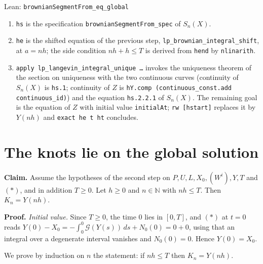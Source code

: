 \documentclass[11pt,a4paper]{article}
\begin{document}
\begin{leanbox}{Lean: \texttt{brownianSegmentFrom\_\allowbreak{}eq\_\allowbreak{}global}}
\begin{enumerate}


\item \texttt{hs} is the specification \texttt{brownian\allowbreak{}Segment\allowbreak{}From\_\allowbreak{}spec} of \(S_n(X)\).

\item \texttt{he} is the shifted equation of the previous step, \texttt{lp\_\allowbreak{}brownian\_\allowbreak{}integral\_\allowbreak{}shift}, at \(a=nh\); the side condition \(nh+h\le T\) is derived from \texttt{hend} by \texttt{nlinarith}.

\item \texttt{apply lp\_\allowbreak{}langevin\_\allowbreak{}integral\_\allowbreak{}unique …} invokes the uniqueness theorem of the section on uniqueness with the two continuous curves (continuity of \(S_n(X)\) is \texttt{hs.\allowbreak{}1}; continuity of \(Z\) is \texttt{h\allowbreak{}Y.\allowbreak{}comp (continuous\_\allowbreak{}const.\allowbreak{}add continuous\_\allowbreak{}id)}) and the equation \texttt{hs.\allowbreak{}2.\allowbreak{}2.\allowbreak{}1} of \(S_n(X)\). The remaining goal is the equation of \(Z\) with initial value \texttt{initial\allowbreak{}At}; \texttt{rw [hstart]} replaces it by \(Y(nh)\) and \texttt{exact he t ht} concludes.

\end{enumerate}
\end{leanbox}

\section{\texorpdfstring{The knots lie on the global solution}{The knots lie on the global solution}}


\textbf{Claim.} Assume the hypotheses of the second step on \(P,U,L,X_0,(W^i),Y,T\) and \((\ast)\), and in addition \(T\ge0\). Let \(h\ge0\) and \(n\in\mathbb N\) with \(nh\le T\). Then \(K_n=Y(nh)\).




\textbf{Proof.} \emph{Initial value.} Since \(T\ge0\), the time \(0\) lies in \([0,T]\), and \((\ast)\) at \(t=0\) reads \(Y(0)-X_0=-\int_0^0\mathcal G(Y(s))\,ds+N_0(0)=0+0\), using that an integral over a degenerate interval vanishes and \(N_0(0)=0\). Hence \(Y(0)=X_0\).




We prove by induction on \(n\) the statement: if \(nh\le T\) then \(K_n=Y(nh)\).
\end{document}
